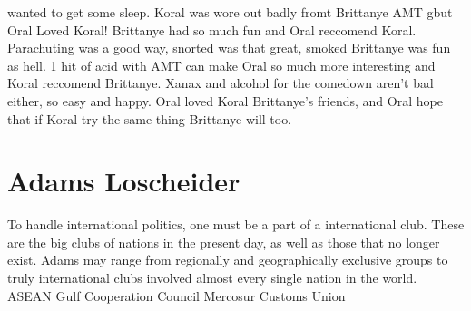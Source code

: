 \documentclass[12pt]{book}
\begin{document}
wanted to get some sleep. Koral was wore out badly fromt Brittanye AMT gbut Oral Loved Koral! Brittanye had so much fun and Oral reccomend Koral. Parachuting was a good way, snorted was that great, smoked Brittanye was fun as hell. 1 hit of acid with AMT can make Oral so much more interesting and Koral reccomend Brittanye. Xanax and alcohol for the comedown aren't bad either, so easy and happy. Oral loved Koral Brittanye's friends, and Oral hope that if Koral try the same thing Brittanye will too.



\chapter{Adams Loscheider}

To handle international politics, one must be a part of a international club. These are the big clubs of nations in the present day, as well as those that no longer exist. Adams may range from regionally and geographically exclusive groups to truly international clubs involved almost every single nation in the world. ASEAN Gulf Cooperation Council Mercosur Customs Union
\end{document}
